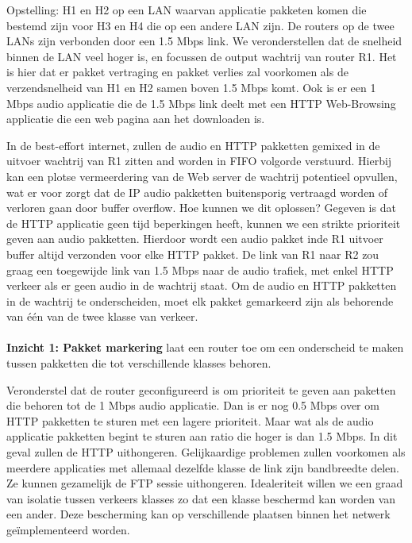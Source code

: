
Opstelling: H1 en H2 op een LAN waarvan applicatie pakketen komen die bestemd zijn voor H3 en H4 die op een andere LAN zijn. De routers op de twee LANs zijn verbonden door een 1.5 Mbps link. We veronderstellen dat de snelheid binnen de LAN veel hoger is, en focussen de output wachtrij van router R1. Het is hier dat er pakket vertraging en pakket verlies zal voorkomen als de verzendsnelheid van H1 en H2 samen boven 1.5 Mbps komt. Ook is er een 1 Mbps audio applicatie die de 1.5 Mbps link deelt met een HTTP Web-Browsing applicatie die een web pagina aan het downloaden is.

In de best-effort internet, zullen de audio en HTTP pakketten gemixed in de uitvoer wachtrij van R1 zitten and worden in FIFO volgorde verstuurd. Hierbij kan een plotse vermeerdering van de Web server de wachtrij potentieel opvullen, wat er voor zorgt dat de IP audio pakketten buitensporig vertraagd worden of verloren gaan door buffer overflow.
Hoe kunnen we dit oplossen? Gegeven is dat de HTTP applicatie geen tijd beperkingen heeft, kunnen we een strikte prioriteit geven aan audio pakketten. Hierdoor wordt een audio pakket inde R1 uitvoer buffer altijd verzonden voor elke HTTP pakket. De link van R1 naar R2 zou graag een toegewijde link van 1.5 Mbps naar de audio trafiek, met enkel HTTP verkeer als er geen audio in de wachtrij staat. Om de audio en HTTP pakketten in de wachtrij te onderscheiden, moet elk pakket gemarkeerd zijn als behorende van één van de twee klasse van verkeer.
\\\\
\textbf{Inzicht 1: Pakket markering} laat een router toe om een onderscheid te maken tussen pakketten die tot verschillende klasses behoren.

Veronderstel dat de router geconfigureerd is om prioriteit te geven aan paketten die behoren tot de 1 Mbps audio applicatie. Dan is er nog 0.5 Mbps over om HTTP pakketten te sturen met een lagere prioriteit. Maar wat als de audio applicatie pakketten begint te sturen aan ratio die hoger is dan 1.5 Mbps. In dit geval zullen de HTTP uithongeren. Gelijkaardige problemen zullen voorkomen als meerdere applicaties met allemaal dezelfde klasse de link zijn bandbreedte delen. Ze kunnen gezamelijk de FTP sessie uithongeren. Idealeriteit willen we een graad van isolatie tussen verkeers klasses zo dat een klasse beschermd kan worden van een ander. Deze bescherming kan op verschillende plaatsen binnen het netwerk geïmplementeerd worden.

